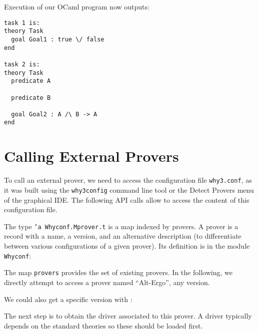 Execution of our OCaml program now outputs:
\begin{verbatim}
task 1 is:
theory Task
  goal Goal1 : true \/ false
end

task 2 is:
theory Task
  predicate A

  predicate B

  goal Goal2 : A /\ B -> A
end
\end{verbatim}

\section{Calling External Provers}

To call an external prover, we need to access the \why configuration
file \texttt{why3.conf}, as it was built using the \texttt{why3config}
command line tool or the \textsf{Detect Provers} menu of the graphical
IDE. The following API calls allow to access the content of this
configuration file.

The type \texttt{'a Whyconf.Mprover.t} is a map indexed by provers. A
prover is a record with a name, a version, and an alternative description
(to differentiate between various configurations of a given prover). Its
definition is in the module \texttt{Whyconf}:

The map \texttt{provers} provides the set of existing provers.
In the following, we directly
attempt to access a prover named ``Alt-Ergo'', any version.

We could also get a specific version with :


The next step is to obtain the driver associated to this prover. A
driver typically depends on the standard theories so these should be
loaded first.


